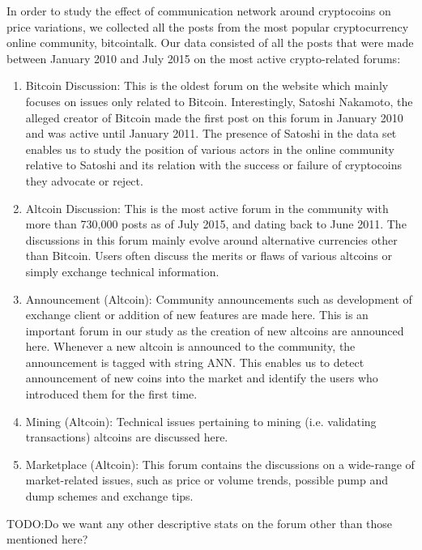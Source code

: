 In order to study the effect of communication network around cryptocoins on
price variations, we collected all the posts from the most popular cryptocurrency
online community, bitcointalk.  Our data consisted of all the posts that were
made between January 2010 and July 2015 on the most active crypto-related forums:
\begin{enumerate}
  \item{Bitcoin Discussion:} This is the oldest forum on the website which mainly focuses
    on issues only related to Bitcoin. Interestingly, Satoshi Nakamoto, the alleged
    creator of Bitcoin made the first post on this forum in January 2010 and
    was active until January 2011. The presence of Satoshi in the data set enables us
    to study the position of various actors in the online community relative to Satoshi
    and its relation with the success or failure of cryptocoins they advocate or reject.

  \item{Altcoin Discussion:} This is the most active forum in the community
    with more than 730,000 posts as of July 2015, and dating back to June 2011.
    The discussions in this forum mainly evolve around alternative currencies
    other than Bitcoin. Users often discuss the merits or flaws of various
    altcoins or simply exchange technical information.
  
  \item{Announcement (Altcoin):} Community announcements such as development of 
    exchange client or addition of new features are made here. This is an important forum
    in our study as the creation of new altcoins are announced here. Whenever a new
    altcoin is announced to the community, the announcement is tagged with string ANN.
    This enables us to detect announcement of new coins into the market and identify
    the users who introduced them for the first time.

  \item{Mining (Altcoin):} Technical issues pertaining to mining (i.e. validating transactions)
    altcoins are discussed here.
  \item{Marketplace (Altcoin):} This forum contains the discussions on a wide-range of 
    market-related issues, such as price or volume trends, possible pump and dump schemes
    and exchange tips.

\end{enumerate}

TODO:Do we want any other descriptive stats on the forum other than those mentioned here? 

